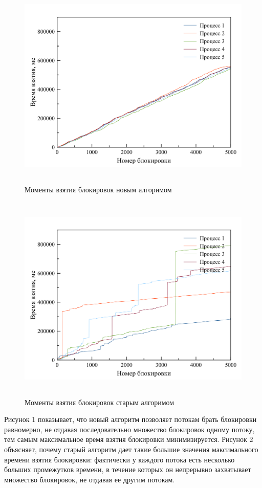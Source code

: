 \begin{figure}[h!]
  \caption{Моменты взятия блокировок новым алгоримом}
  \centering
    \includegraphics[height=10cm]{5_new.png}
\end{figure}

\begin{figure}[h!]
  \caption{Моменты взятия блокировок старым алгоримом}
  \centering
    \includegraphics[height=10cm]{5_old.png}
\end{figure}

Рисунок 1 показывает, что новый алгоритм позволяет потокам брать блокировки равномерно, не отдавая последовательно множество блокировок одному потоку, тем самым максимальное время взятия блокировки минимизируется. Рисунок 2 объясняет, почему старый алгоритм дает такие большие значения максимального времени взятия блокировки: фактически у каждого потока есть несколько больших промежутков времени, в течение которых он непрерывно захватывает множество блокировок, не отдавая ее другим потокам.

